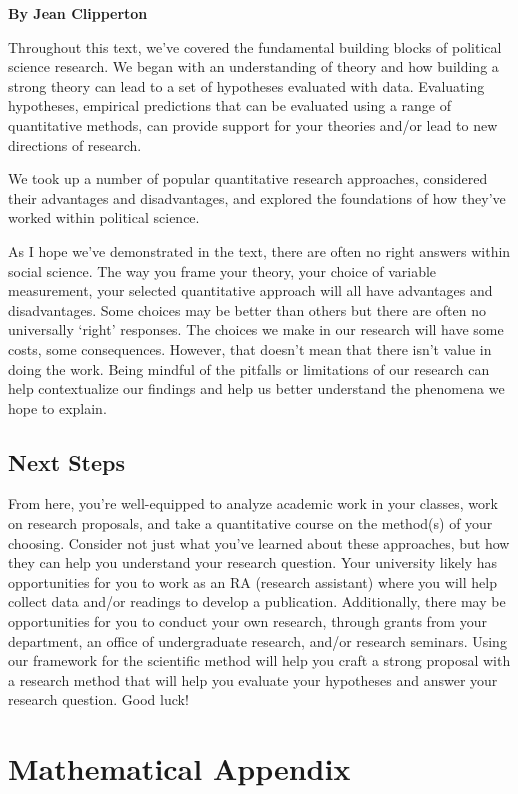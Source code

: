 \documentclass{book}
\begin{document}
\textbf{By Jean Clipperton}

Throughout this text, we've covered the fundamental building blocks of
political science research. We began with an understanding of theory and how
building a strong theory can lead to a set of hypotheses evaluated with data.
Evaluating hypotheses, empirical predictions that can be evaluated using a
range of quantitative methods, can provide support for your theories and/or
lead to new directions of research.

We took up a number of popular quantitative research approaches, considered
their advantages and disadvantages, and explored the foundations of how
they've worked within political science.

As I hope we've demonstrated in the text, there are often no right answers
within social science. The way you frame your theory, your choice of variable
measurement, your selected quantitative approach will all have advantages and
disadvantages. Some choices may be better than others but there are often no
universally `right' responses. The choices we make in our research will have
some costs, some consequences. However, that doesn't mean that there isn't
value in doing the work. Being mindful of the pitfalls or limitations of our
research can help contextualize our findings and help us better understand the
phenomena we hope to explain.

\hypertarget{next-steps}{%
\section{Next Steps}\label{next-steps}}

From here, you're well-equipped to analyze academic work in your classes, work
on research proposals, and take a quantitative course on the method(s) of your
choosing. Consider not just what you've learned about these approaches, but
how they can help you understand your research question. Your university
likely has opportunities for you to work as an RA (research assistant) where
you will help collect data and/or readings to develop a publication.
Additionally, there may be opportunities for you to conduct your own research,
through grants from your department, an office of undergraduate research,
and/or research seminars. Using our framework for the scientific method will
help you craft a strong proposal with a research method that will help you
evaluate your hypotheses and answer your research question. Good luck!

\hypertarget{mathematical-appendix}{%
\chapter{Mathematical Appendix}\label{mathematical-appendix}}
\end{document}
